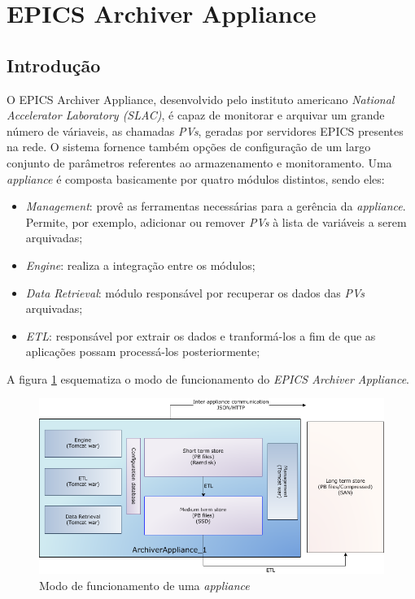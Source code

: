\section {EPICS Archiver Appliance}

\subsection {Introdução}

O EPICS Archiver Appliance, desenvolvido pelo instituto americano
\textit{National Accelerator Laboratory (SLAC)}, é capaz de monitorar e arquivar
um grande número de váriaveis, as chamadas \textit{PVs}, geradas por servidores
EPICS presentes na rede. O sistema fornence também opções de configuração de um
largo conjunto de parâmetros referentes ao armazenamento e monitoramento. Uma
\textit{appliance} é composta basicamente por quatro módulos distintos, sendo eles:

\begin{itemize}
  \renewcommand\labelitemi{--}
  \item \textit{Management}: provê as ferramentas necessárias para a gerência
  da \textit{appliance}. Permite, por exemplo, adicionar ou remover \textit{PVs}
  à lista de variáveis a serem arquivadas;
  \item \textit{Engine}: realiza a integração entre os módulos;
  \item \textit{Data Retrieval}: módulo responsável por recuperar os dados das
  \textit{PVs} arquivadas;
  \item \textit{ETL}: responsável por extrair os dados e tranformá-los a fim de
  que as aplicações possam processá-los posteriormente;
\end{itemize}

A figura \ref{fig:epics_archiver} esquematiza o modo de funcionamento do
\textit{EPICS Archiver Appliance}.

\FloatBarrier

\begin{figure}[h]
    
    \centering
    \includegraphics[scale=0.6]{image/applarch}
    \caption {Modo de funcionamento de uma \textit{appliance}}
    \label{fig:epics_archiver} 
\end{figure} 

